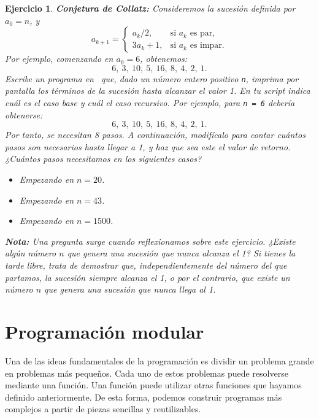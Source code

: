 \documentclass[11pt,a4paper]{article}
\newcommand{\R}{\textcolor{azuluc}{\faIcon{r-project}}}
\theoremstyle{exercise}
\newtheorem{exercise}{Ejercicio}
\begin{document}
\begin{exercise} \textbf{Conjetura de Collatz:} Consideremos la sucesión definida por $a_0=n$, y
\[
a_{k+1}=
\begin{cases}
	a_k/2, & \text{si } a_k \text{ es par}, \\
	3a_k+1, & \text{si } a_k \text{ es impar}.
\end{cases}
\]
Por ejemplo, comenzando en $a_0=6$, obtenemos:
\[
6,\ 3,\ 10,\ 5,\ 16,\ 8,\ 4,\ 2,\ 1.
\]
Escribe un programa en \R\ que, dado un número entero positivo \texttt{n}, imprima por pantalla los términos de la sucesión hasta alcanzar el valor 1. En tu script indica cuál es el caso base y cuál el caso recursivo. Por ejemplo, para \texttt{n = 6} debería obtenerse:
\[
6,\ 3,\ 10,\ 5,\ 16,\ 8,\ 4,\ 2,\ 1.
\]
Por tanto, se necesitan 8 pasos. A continuación, modifícalo para contar cuántos pasos son necesarios hasta llegar a 1, y haz que sea este el valor de retorno. ¿Cuántos pasos necesitamos en los siguientes casos?
\begin{itemize}
	\item Empezando en $n=20$.
	\item Empezando en $n=43$.
	\item Empezando en $n=1500$.
\end{itemize}


\noindent \textbf{Nota:} Una pregunta surge cuando reflexionamos sobre este ejercicio. ¿Existe algún número $n$ que genera una sucesión que nunca alcanza el 1? Si tienes la tarde libre, trata de demostrar que, independientemente del número del que partamos, la sucesión siempre alcanza el 1, o por el contrario, que existe un número $n$ que genera una sucesión que nunca llega al 1.
\end{exercise}



\section{Programación modular} 

Una de las ideas fundamentales de la programación es dividir un problema grande en problemas más pequeños. Cada uno de estos problemas puede resolverse mediante una función. Una función puede utilizar otras funciones que hayamos definido anteriormente. De esta forma, podemos construir programas más complejos a partir de piezas sencillas y reutilizables.
\end{document}
